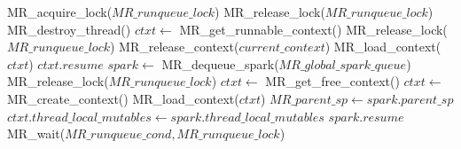 \begin{algorithm}
\begin{algorithmic}
  \State MR\_acquire\_lock($MR\_runqueue\_lock$)
  \Loop
      \State MR\_release\_lock($MR\_runqueue\_lock$)
      \State MR\_destroy\_thread()
    \EndIf
    \State $ctxt \gets$ MR\_get\_runnable\_context()
      \State MR\_release\_lock($MR\_runqueue\_lock$)
        \State MR\_release\_context($current\_context$)
      \EndIf
      \State MR\_load\_context($ctxt$)
      \Goto $ctxt.resume$
    \EndIf
    \State $spark \gets$ MR\_dequeue\_spark($MR\_global\_spark\_queue$)
      \State MR\_release\_lock($MR\_runqueue\_lock$)
        \State $ctxt \gets$ MR\_get\_free\_context()
          \State $ctxt \gets$ MR\_create\_context()
        \EndIf
        \State MR\_load\_context($ctxt$)
      \EndIf
      \State $MR\_parent\_sp \gets spark.parent\_sp$
      \State $ctxt.thread\_local\_mutables \gets
        spark.thread\_local\_mutables$
      \Goto $spark.resume$
    \EndIf
    \State MR\_wait($MR\_runqueue\_cond, MR\_runqueue\_lock$)
  \EndLoop
\EndProcedure
\end{algorithmic}
\caption{\idle}
\label{alg:MR_idle_initial}
\end{algorithm}

